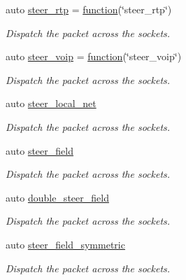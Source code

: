 \begin{DoxyCompactItemize}
auto \hyperlink{namespacepfq_1_1lang_1_1anonymous__namespace_02default_8hpp_03_ac3bc5ec07d93fa5d9266e0e08191fe22}{steer\+\_\+rtp} = \hyperlink{namespacepfq_1_1lang_a1a4638059d700ae08d0ca63886ff2bb3}{function}(\char`\"{}steer\+\_\+rtp\char`\"{})
\begin{DoxyCompactList}\small\item\em Dispatch the packet across the sockets. \end{DoxyCompactList}\item 
auto \hyperlink{namespacepfq_1_1lang_1_1anonymous__namespace_02default_8hpp_03_a50fa612c45aa8f8dfd3259e2d0cbfce0}{steer\+\_\+voip} = \hyperlink{namespacepfq_1_1lang_a1a4638059d700ae08d0ca63886ff2bb3}{function}(\char`\"{}steer\+\_\+voip\char`\"{})
\begin{DoxyCompactList}\small\item\em Dispatch the packet across the sockets. \end{DoxyCompactList}\item 
auto \hyperlink{namespacepfq_1_1lang_1_1anonymous__namespace_02default_8hpp_03_a9c26772930b75805453c19d0d5129c71}{steer\+\_\+local\+\_\+net}
\begin{DoxyCompactList}\small\item\em Dispatch the packet across the sockets. \end{DoxyCompactList}\item 
auto \hyperlink{namespacepfq_1_1lang_1_1anonymous__namespace_02default_8hpp_03_ad861e297a10876e534c5c9053ec23999}{steer\+\_\+field}
\begin{DoxyCompactList}\small\item\em Dispatch the packet across the sockets. \end{DoxyCompactList}\item 
auto \hyperlink{namespacepfq_1_1lang_1_1anonymous__namespace_02default_8hpp_03_a7dc3ed59d8c7f4ff200e220a732cebdd}{double\+\_\+steer\+\_\+field}
\begin{DoxyCompactList}\small\item\em Dispatch the packet across the sockets. \end{DoxyCompactList}\item 
auto \hyperlink{namespacepfq_1_1lang_1_1anonymous__namespace_02default_8hpp_03_a422c7bafe8240549d193903890f9ec48}{steer\+\_\+field\+\_\+symmetric}
\begin{DoxyCompactList}\small\item\em Dispatch the packet across the sockets. \end{DoxyCompactList}\item 

\end{DoxyCompactItemize}
